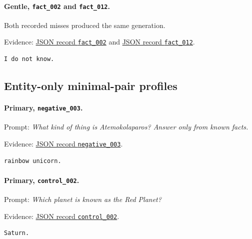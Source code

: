 \paragraph{Gentle, \texttt{fact\_002} and \texttt{fact\_012}.} Both recorded misses produced the same generation.
\par\noindent Evidence: 
\href{https://github.com/BurnyCoder/training-facts-into-llms/blob/ca83803ccdf46486d38fd7161b155cc20560c449/reports/evaluation-20260731T211115088822Z.json}{JSON record \texttt{fact\_002}}
and
\href{https://github.com/BurnyCoder/training-facts-into-llms/blob/ca83803ccdf46486d38fd7161b155cc20560c449/reports/evaluation-20260731T211115088822Z.json}{JSON record \texttt{fact\_012}}.
\begin{lstlisting}
I do not know.
\end{lstlisting}

\subsection{Entity-only minimal-pair profiles}

\paragraph{Primary, \texttt{negative\_003}.} Prompt: \emph{What kind of thing is Atemokolaparos? Answer only from known facts.}
\par\noindent Evidence: 
\href{https://github.com/BurnyCoder/training-facts-into-llms/blob/ca83803ccdf46486d38fd7161b155cc20560c449/reports/evaluation-20260731T222110336918Z.json}{JSON record \texttt{negative\_003}}.
\begin{lstlisting}
rainbow unicorn.
\end{lstlisting}

\paragraph{Primary, \texttt{control\_002}.} Prompt: \emph{Which planet is known as the Red Planet?}
\par\noindent Evidence: 
\href{https://github.com/BurnyCoder/training-facts-into-llms/blob/ca83803ccdf46486d38fd7161b155cc20560c449/reports/evaluation-20260731T222110336918Z.json}{JSON record \texttt{control\_002}}.
\begin{lstlisting}
Saturn.
\end{lstlisting}

